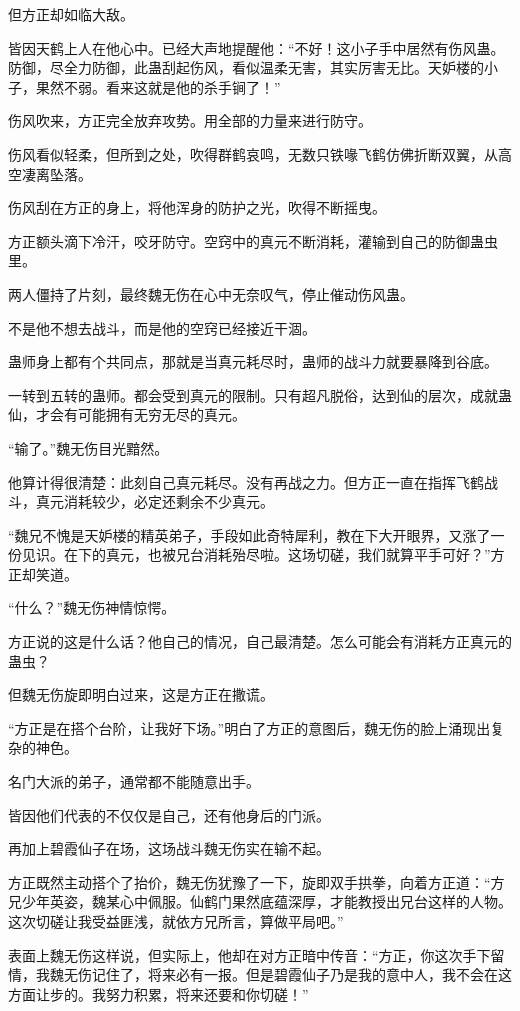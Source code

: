 \begin{this_body}
但方正却如临大敌。

皆因天鹤上人在他心中。已经大声地提醒他：“不好！这小子手中居然有伤风蛊。防御，尽全力防御，此蛊刮起伤风，看似温柔无害，其实厉害无比。天妒楼的小子，果然不弱。看来这就是他的杀手锏了！”

伤风吹来，方正完全放弃攻势。用全部的力量来进行防守。

伤风看似轻柔，但所到之处，吹得群鹤哀鸣，无数只铁喙飞鹤仿佛折断双翼，从高空凄离坠落。

伤风刮在方正的身上，将他浑身的防护之光，吹得不断摇曳。

方正额头滴下冷汗，咬牙防守。空窍中的真元不断消耗，灌输到自己的防御蛊虫里。

两人僵持了片刻，最终魏无伤在心中无奈叹气，停止催动伤风蛊。

不是他不想去战斗，而是他的空窍已经接近干涸。

蛊师身上都有个共同点，那就是当真元耗尽时，蛊师的战斗力就要暴降到谷底。

一转到五转的蛊师。都会受到真元的限制。只有超凡脱俗，达到仙的层次，成就蛊仙，才会有可能拥有无穷无尽的真元。

“输了。”魏无伤目光黯然。

他算计得很清楚：此刻自己真元耗尽。没有再战之力。但方正一直在指挥飞鹤战斗，真元消耗较少，必定还剩余不少真元。

“魏兄不愧是天妒楼的精英弟子，手段如此奇特犀利，教在下大开眼界，又涨了一份见识。在下的真元，也被兄台消耗殆尽啦。这场切磋，我们就算平手可好？”方正却笑道。

“什么？”魏无伤神情惊愕。

方正说的这是什么话？他自己的情况，自己最清楚。怎么可能会有消耗方正真元的蛊虫？

但魏无伤旋即明白过来，这是方正在撒谎。

“方正是在搭个台阶，让我好下场。”明白了方正的意图后，魏无伤的脸上涌现出复杂的神色。

名门大派的弟子，通常都不能随意出手。

皆因他们代表的不仅仅是自己，还有他身后的门派。

再加上碧霞仙子在场，这场战斗魏无伤实在输不起。

方正既然主动搭个了抬价，魏无伤犹豫了一下，旋即双手拱拳，向着方正道：“方兄少年英姿，魏某心中佩服。仙鹤门果然底蕴深厚，才能教授出兄台这样的人物。这次切磋让我受益匪浅，就依方兄所言，算做平局吧。”

表面上魏无伤这样说，但实际上，他却在对方正暗中传音：“方正，你这次手下留情，我魏无伤记住了，将来必有一报。但是碧霞仙子乃是我的意中人，我不会在这方面让步的。我努力积累，将来还要和你切磋！”


\end{this_body}
